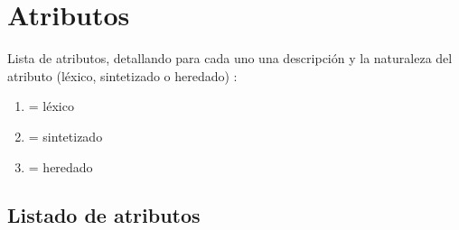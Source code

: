\chapter{Atributos}

Lista de atributos, detallando para cada uno una descripción y la naturaleza del atributo (léxico, sintetizado o heredado) :

\begin{enumerate}
	\item {} = léxico 
	\item {} = sintetizado 
	\item {} = heredado 
\end{enumerate}

\section*{Listado de atributos}

